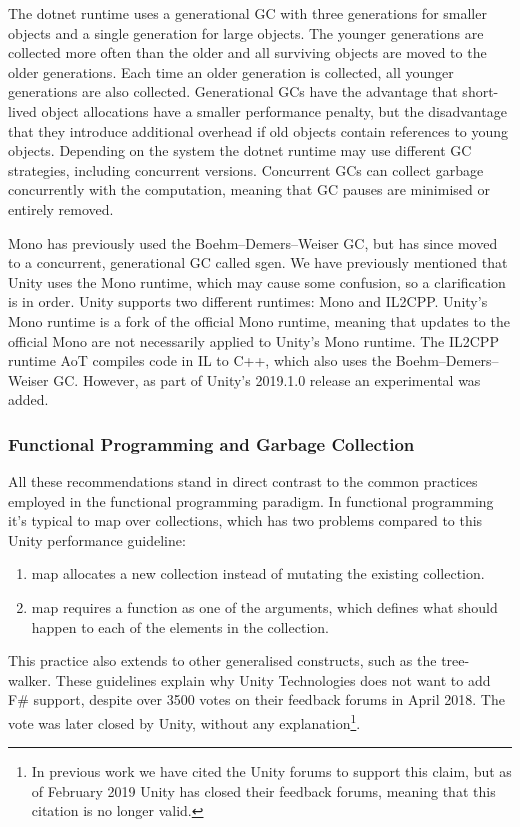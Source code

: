 The dotnet runtime uses a generational \gls{GC} with three generations for smaller objects and a single generation for large objects\cite{dotnet:gc}. The younger generations are collected more often than the older and all surviving objects are moved to the older generations. Each time an older generation is collected, all younger generations are also collected. Generational \glspl{GC} have the advantage that short-lived object allocations have a smaller performance penalty, but the disadvantage that they introduce additional overhead if old objects contain references to young objects\cite{sestoft2017programming}. Depending on the system the dotnet runtime may use different \gls{GC} strategies, including concurrent versions\cite{dotnet:gc}. Concurrent \glspl{GC} can collect garbage concurrently with the computation, meaning that \gls{GC} pauses are minimised or entirely removed\cite{dotnet:gc}.

Mono has previously used the Boehm–Demers–Weiser \gls{GC}, but has since moved to a concurrent, generational \gls{GC} called sgen\cite{mono:gc}. We have previously mentioned that Unity uses the Mono runtime, which may cause some confusion, so a clarification is in order. Unity supports two different runtimes: Mono and IL2CPP. Unity's Mono runtime is a fork of the official Mono runtime\cite{unity:mono:github}, meaning that updates to the official Mono are not necessarily applied to Unity's Mono runtime. The IL2CPP runtime \gls{AoT} compiles code in \gls{IL} to C++, which also uses the Boehm–Demers–Weiser \gls{GC}\cite{il2cpp:gc}. However, as part of Unity's 2019.1.0 release an experimental \textit{} was added\cite{unity:roadmap}.

\subsubsection{Functional Programming and Garbage Collection}\label{sec:func-garbage}
All these recommendations stand in direct contrast to the common practices employed in the functional programming paradigm. In functional programming it's typical to map over collections, which has two problems compared to this Unity performance guideline:
\begin{enumerate}
    \item map allocates a new collection instead of mutating the existing collection.
    \item map requires a function as one of the arguments, which defines what should happen to each of the elements in the collection.
\end{enumerate}
This practice also extends to other generalised constructs, such as the tree-walker\cite{normark2008mapping}. These guidelines explain why Unity Technologies does not want to add F\# support, despite over 3500 votes on their feedback forums in April 2018\cite{unity:fsharp}. The vote was later closed by Unity, without any explanation\footnote{In previous work we have cited the Unity forums to support this claim\cite{p92018gameplay}, but as of February 2019 Unity has closed their feedback forums, meaning that this citation is no longer valid.}.


